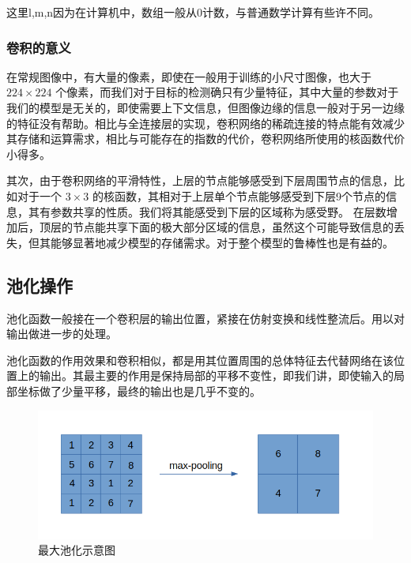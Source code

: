 这里l,m,n因为在计算机中，数组一般从0计数，与普通数学计算有些许不同。

\subsubsection{卷积的意义}

在常规图像中，有大量的像素，即使在一般用于训练的小尺寸图像，也大于 $ 224 \times 224 $ 个像素，而我们对于目标的检测确只有少量特征，其中大量的参数对于我们的模型是无关的，即使需要上下文信息，但图像边缘的信息一般对于另一边缘的特征没有帮助。相比与全连接层的实现，卷积网络的稀疏连接的特点能有效减少其存储和运算需求，相比与可能存在的指数的代价，卷积网络所使用的核函数代价小得多。

其次，由于卷积网络的平滑特性，上层的节点能够感受到下层周围节点的信息，比如对于一个 $ 3 \times 3 $ 的核函数，其相对于上层单个节点能够感受到下层9个节点的信息，其有参数共享的性质。我们将其能感受到下层的区域称为感受野。
在层数增加后，顶层的节点能共享下面的极大部分区域的信息，虽然这个可能导致信息的丢失，但其能够显著地减少模型的存储需求。对于整个模型的鲁棒性也是有益的。

\subsection{池化操作}

池化函数一般接在一个卷积层的输出位置，紧接在仿射变换和线性整流后。用以对输出做进一步的处理。

池化函数的作用效果和卷积相似，都是用其位置周围的总体特征去代替网络在该位置上的输出。其最主要的作用是保持局部的平移不变性，即我们讲，即使输入的局部坐标做了少量平移，最终的输出也是几乎不变的。

\begin{figure}[!tbp]
    \centering
    \includegraphics[width=\textwidth]{figures/max-pooling.png}
    \caption{最大池化示意图}
    \vspace{-1em}
    \label{fig:max-pooling}
\end{figure}

